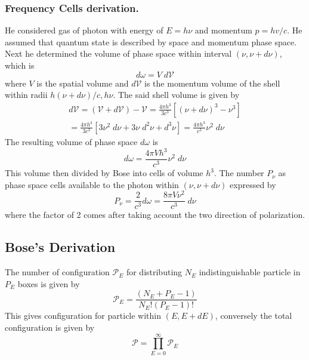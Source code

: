 \documentclass[../../../Main.tex]{subfiles}
\begin{document}
\subsubsection*{Frequency Cells derivation.} He considered gas of photon with energy of $E=h\nu$ and momentum $p=hv/c$. He assumed that quantum state is described by space and momentum phase space. Next he determined the volume of phase space within interval $(\nu,\nu+d\nu)$, which is
\begin{equation*}
    d\omega=V\;d\mathcal{V}
\end{equation*}
where $V$ is the spatial volume and $d\mathcal{V}$ is the momentum volume of the shell within radii $h(\nu+d\nu)/c,h\nu$. The said shell volume is given by
\begin{multline*}
    d\mathcal{V}=(\mathcal{V}+d\mathcal{V})-\mathcal{V}=\frac{4\pi h^3}{3c^3}\left[(\nu+d\nu)^3-\nu^3\right] \\= \frac{4\pi h^3}{3c^3}\left[3\nu^2\;d\nu+3\nu\;d^2\nu+d^3\nu\right]=\frac{4\pi h^3}{c^3}\nu^2\;d\nu
\end{multline*}
The resulting volume of phase space $d\omega$ is
\begin{equation*}
    d\omega=\frac{4\pi V h^3}{c^3}\nu^2\;d\nu
\end{equation*}
This volume then divided by Bose into cells of volume $h^3$. The number $P_\nu$ as phase space cells available to the photon within $(\nu,\nu+d\nu)$ expressed by
\begin{equation*}
    P_\nu=\frac{2}{c^3}d\omega=\frac{8\pi V\nu^2}{c^3}\;d\nu
\end{equation*}
where the factor of 2 comes after taking account the two direction of polarization. 

\subsection*{Bose's Derivation}

The number of configuration $\mathcal{P}_E$ for distributing $N_E$ indistinguishable particle in $P_E$ boxes is given by 
\begin{equation*}
    \mathcal{P}_E=\frac{(N_E+P_E-1)}{N_E! (P_E-1)!}
\end{equation*}
This gives configuration for particle within $(E,E+dE)$, conversely the total configuration is given by 
\begin{equation*}
    \mathcal{P}=\prod_{E=0}^{\infty}\mathcal{P}_E
\end{equation*}
\end{document}
